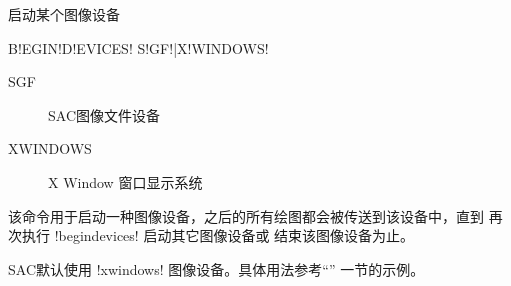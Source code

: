 \label{cmd:begindevices}

启动某个图像设备

\begin{SACSTX}
B!EGIN!D!EVICES! S!GF!|X!WINDOWS!
\end{SACSTX}

\begin{description}
\item [SGF] SAC图像文件设备
\item [XWINDOWS] X Window 窗口显示系统
\end{description}

该命令用于启动一种图像设备，之后的所有绘图都会被传送到该设备中，直到
再次执行 !begindevices! 启动其它图像设备或 
结束该图像设备为止。

SAC默认使用 !xwindows! 图像设备。具体用法参考``''
一节的示例。
